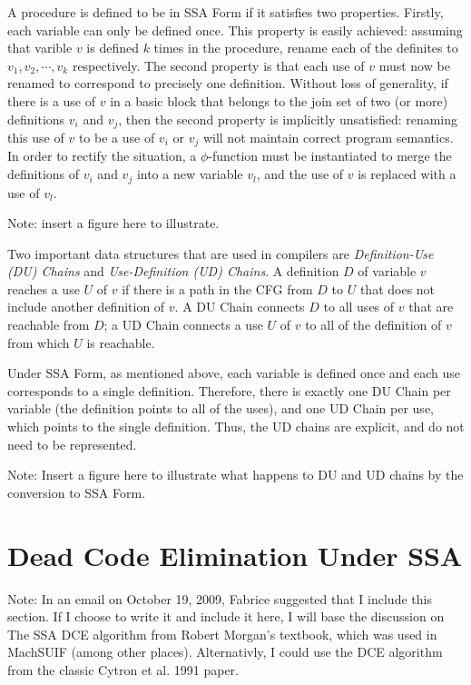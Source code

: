 A procedure is defined to be in SSA Form if it satisfies
two properties. Firstly, each variable can only be defined
once. This property is easily achieved: assuming that varible
$v$ is defined $k$ times in the procedure, rename each of the
definites to $v_{1}, v_{2}, \cdots, v_{k}$ respectively. 
The second property is that each use of $v$ must now be
renamed to correspond to precisely one definition. Without
loss of generality, if there is a use of $v$ in a basic block
that belongs to the join set of two (or more) definitions
$v_{i}$ and $v_{j}$, then the second property is implicitly
unsatisfied: renaming this use of $v$ to be a use of $v_{i}$ or
$v_{j}$ will not maintain correct program semantics. In order
to rectify the situation, a $\phi$-function must be instantiated
to merge the definitions of $v_{i}$ and $v_{j}$ into a new 
variable $v_{l}$, and the use of $v$ is replaced with a use
of $v_{l}$. 

Note: insert a figure here to illustrate. 

Two important data structures that are used in compilers are
\emph{Definition-Use (DU) Chains} and 
\emph{Use-Definition (UD) Chains}. A definition $D$ of variable
$v$ reaches a use $U$ of $v$ if there is a path in the CFG
from $D$ to $U$ that does not include another definition of $v$. 
A DU Chain connects $D$ to all uses of $v$ that are reachable
from $D$; a UD Chain connects a use $U$ of $v$ to all of the 
definition of $v$ from which $U$ is reachable. 

Under SSA Form, as mentioned above, each variable is defined 
once and each use corresponds to a single definition. Therefore,
there is exactly one DU Chain per variable (the definition points
to all of the uses), and one UD Chain per use, which points to the
single definition. Thus, the UD chains are explicit, and do not
need to be represented.

Note: Insert a figure here to illustrate what happens to DU
and UD chains by the conversion to SSA Form.  

\section{Dead Code Elimination Under SSA}

Note: In an email on October 19, 2009, Fabrice suggested that
I include this section. If I choose to write it and include it
here, I will base the discussion on The SSA DCE algorithm from
Robert Morgan's textbook, which was used in MachSUIF (among 
other places). Alternativly, I could use the DCE algorithm
from the classic Cytron et al. 1991 paper. 

